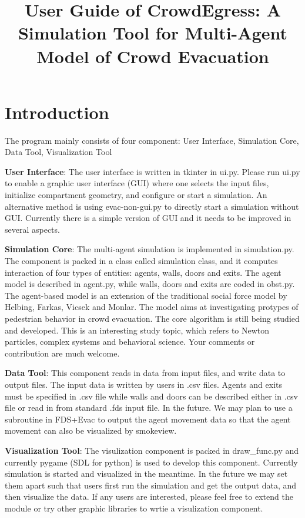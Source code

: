 \documentclass{article}
\begin{document}
\title{User Guide of CrowdEgress: A Simulation Tool for Multi-Agent Model of Crowd Evacuation}

\maketitle

\section{Introduction}

The program mainly consists of four component: User Interface, Simulation Core, Data Tool, Visualization Tool

\textbf{User Interface}: The user interface is written in tkinter in ui.py.  Please run ui.py to enable a graphic user interface (GUI) where one selects the input files, initialize compartment geometry, and configure or start a simulation.  An alternative method is using evac-non-gui.py to directly start a simulation without GUI.  Currently there is a simple version of GUI and it needs to be improved in several aspects.  

\textbf{Simulation Core}: The multi-agent simulation is implemented in simulation.py.  The component is packed in a class called simulation class, and it computes interaction of four types of entities: agents, walls, doors and exits.  The agent model is described in agent.py, while walls, doors and exits are coded in obst.py.  The agent-based model is an extension of the traditional social force model by Helbing, Farkas, Vicsek and Monlar.  The model aims at investigating protypes of pedestrian behavior in crowd evacuation.  The core algorithm is still being studied and developed.  This is an interesting study topic, which refers to Newton particles, complex systems and behavioral science.  Your comments or contribution are much welcome.  

\textbf{Data Tool}: This component reads in data from input files, and write data to output files.  The input data is written by users in .csv files.  Agents and exits must be specified in .csv file while walls and doors can be described either in .csv file or read in from standard .fds input file.  In the future.  We may plan to use a subroutine in FDS+Evac to output the agent movement data so that the agent movement can also be visualized by smokeview. 

\textbf{Visualization Tool}: The visulization component is packed in draw\_func.py and currently pygame (SDL for python) is used to develop this component.  Currently simulation is started and visualized in the meantime.  In the future we may set them apart such that users first run the simulation and get the output data, and then visualize the data.  If any users are interested, please feel free to extend the module or try other graphic libraries to wrtie a visulization component.
\end{document}
